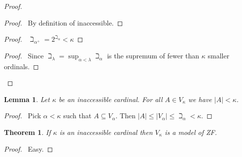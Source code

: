 \documentclass{article}
\let\qed\relax
\newtheorem{lemma}[axiom]{Lemma}
\newtheorem{theorem}[axiom]{Theorem}
\theoremstyle{definition}
\begin{document}
    \begin{proof}
        \pf
        \begin{proof}
            \pf\ By definition of inaccessible.
        \end{proof}
        \begin{proof}
            \pf\ $\beth_{\alpha^+} = 2^{\beth_\alpha} < \kappa$
        \end{proof}
        \begin{proof}
            \pf\ Since $\beth_\lambda = \sup_{\alpha < \lambda} \beth_\alpha$ is the supremum of fewer than $\kappa$
            smaller ordinals.
        \end{proof}
        \qed
    \end{proof}

    \begin{lemma}
        Let $\kappa$ be an inaccessible cardinal. For all $A \in V_\kappa$ we have $|A| < \kappa$.
    \end{lemma}

    \begin{proof}
        \pf\ Pick $\alpha < \kappa$ such that $A \subseteq V_\alpha$. Then $|A| \leq |V_\alpha| \leq \beth_\alpha < \kappa$. \qed
    \end{proof}

    \begin{theorem}
        If $\kappa$ is an inaccessible cardinal then $V_\kappa$ is a model of ZF.
    \end{theorem}

    \begin{proof}
        \pf\ Easy. \qed
    \end{proof}
\end{document}

